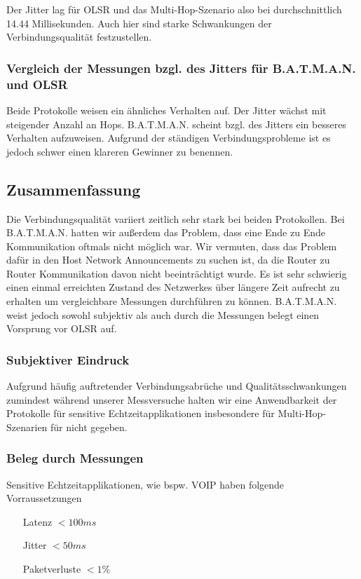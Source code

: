 \documentclass[a4paper,10pt]{article}
\begin{document}
Der Jitter lag für OLSR und das Multi-Hop-Szenario also bei durchschnittlich 14.44 Millisekunden.
Auch hier sind starke Schwankungen der Verbindungsqualität festzustellen.

\subsubsection{Vergleich der Messungen bzgl. des Jitters für B.A.T.M.A.N. und OLSR}

Beide Protokolle weisen ein ähnliches Verhalten auf.
Der Jitter wächst mit steigender Anzahl an Hops.
B.A.T.M.A.N. scheint bzgl. des Jitters ein besseres Verhalten aufzuweisen.
Aufgrund der ständigen Verbindungsprobleme ist es jedoch schwer einen klareren Gewinner zu benennen.

\subsection{Zusammenfassung}

Die Verbindungsqualität variiert zeitlich sehr stark bei beiden Protokollen.
Bei B.A.T.M.A.N. hatten wir außerdem das Problem, dass eine Ende zu Ende Kommunikation oftmals nicht möglich war.
Wir vermuten, dass das Problem dafür in den Host Network Announcements zu suchen ist, da die Router zu Router Kommunikation davon nicht beeinträchtigt wurde.
Es ist sehr schwierig einen einmal erreichten Zustand des Netzwerkes über längere Zeit aufrecht zu erhalten um vergleichbare Messungen durchführen zu können.
B.A.T.M.A.N. weist jedoch sowohl subjektiv als auch durch die Messungen belegt einen Vorsprung vor OLSR auf.

\subsubsection*{Subjektiver Eindruck}

Aufgrund häufig auftretender Verbindungsabrüche und Qualitätsschwankungen zumindest während unserer Messversuche halten wir eine Anwendbarkeit der Protokolle für sensitive Echtzeitapplikationen insbesondere für Multi-Hop-Szenarien für nicht gegeben. 

\subsubsection*{Beleg durch Messungen}

Sensitive Echtzeitapplikationen, wie bspw. VOIP haben folgende Vorraussetzungen 

\begin{itemize}
  \item[Latenz] $< 100ms$
  \item[Jitter] $< 50ms$
  \item[Paketverluste] $< 1\%$
\end{itemize}
\end{document}
